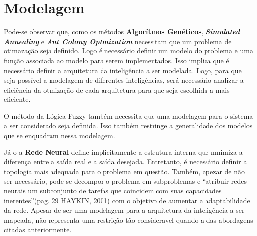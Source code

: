 \section{Modelagem}

Pode-se observar que, como os métodos \textbf{Algorítmos Genéticos},
\textbf{\emph{Simulated Annealing}} e \textbf{\emph{Ant Colony
Optmization}} necessitam que um problema de otimazação seja definido.
Logo é necessário definir um modelo do problema e uma função associada
ao modelo para serem implementados. Isso implica que é necessário
definir a arquitetura da inteligência a ser modelada. Logo, para que
seja possível a modelagem de diferentes inteligências, será necessário
analizar a eficiência da otmização de cada arquitetura para que seja
escolhida a mais eficiente.

O método da Lógica Fuzzy também necessita que uma modelagem para o
sistema a ser considerado seja definida. Isso também restringe a
generalidade dos modelos que se enquadram nessa modelagem.

Já o a \textbf{Rede Neural} define implicitamente a estrutura interna
que mnimiza a diferença entre a saída real e a saída desejada.
Entretanto, é necessário definir a topologia mais adequada para o
problema em questão. Também, apezar de não ser necessário, pode-se
decompor o problema em subproblemas e ``atribuir redes neurais um
subconjunto de tarefas que coincidem com suas capacidades
inerentes''(pag. 29 HAYKIN, 2001) com o objetivo de aumentar a
adaptabilidade da rede. Apesar de ser uma modelagem para a arquitetura
da inteligência a ser mapeada, não representa uma restrição tão
consideravel quando a das abordagens citadas anteriormente.
